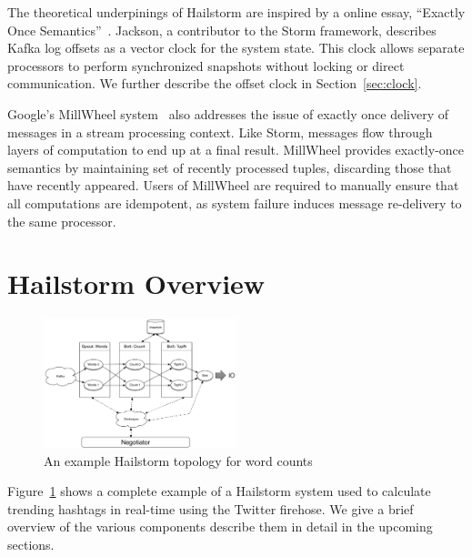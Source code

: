 \documentclass[10pt,nocopyrightspace]{sigplanconf}
\begin{document}
The theoretical underpinings of Hailstorm are inspired by a online essay,
``Exactly Once Semantics''~\cite{jackson2014}. Jackson, a contributor to the
Storm framework, describes Kafka log offsets as a vector clock for the system
state. This clock allows separate processors to perform synchronized snapshots
without locking or direct communication. We further describe the offset clock
in Section~\ref{sec:clock}.

Google's MillWheel system~\cite{millwheel} also addresses the issue of exactly
once delivery of messages in a stream processing context. Like Storm,
messages flow through layers of computation to end up at a final result.
MillWheel provides exactly-once semantics by maintaining set of recently
processed tuples, discarding those that have recently appeared. Users of
MillWheel are required to manually ensure that all computations are
idempotent, as system failure induces message re-delivery to the same processor.

\section{Hailstorm Overview}


\begin{figure}
\centering
\includegraphics[width=0.5\textwidth]{images/architecture.pdf}
\caption{An example Hailstorm topology for word counts}
\label{fig:topology}
\end{figure}

Figure~\ref{fig:topology} shows a complete example of a Hailstorm system used
to calculate trending hashtags in real-time using the Twitter firehose. We give
a brief overview of the various components describe them in detail in the
upcoming sections.
\end{document}
